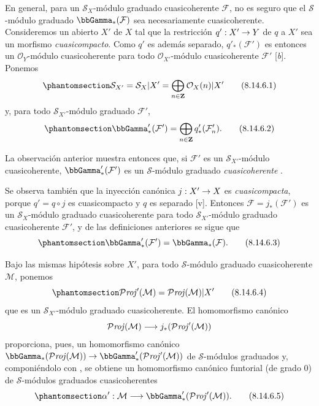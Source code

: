 \documentclass[oneside,10pt]{amsart}
\makeatletter
\newcommand{\ega@arrow}[2]{\mathchoice{#1}{#2}{#2}{#2}}
\renewcommand{\to}{\ega@arrow{\longrightarrow}{\rightarrow}}
\let\EGAOriginalLabel\label
\renewcommand{\label}[1]{\phantomsection\EGAOriginalLabel{#1}}
\makeatother
\begin{document}
\begin{env}[8.14.6]
\label{II.8.14.6-fr}
En general, para un $\mathcal{S}_X$-módulo graduado cuasicoherente $\mathcal{F}$, no es seguro que el $\mathcal{S}$-módulo graduado $\bbGamma_*(\mathcal{F})$ sea necesariamente cuasicoherente.
Consideremos un abierto $X'$ de $X$ tal que la restricción $q':X'\to Y$ de $q$ a $X'$ sea un morfismo \emph{cuasicompacto}.
Como $q'$ es además separado, $q'_*(\mathcal{F}')$ es entonces un $\mathcal{O}_Y$-módulo cuasicoherente para todo $\mathcal{O}_{X'}$-módulo cuasicoherente $\mathcal{F}'$ [\emph{b}].
Ponemos
\begin{equation}
\label{II.8.14.6.1-fr}
  \mathcal{S}_{X'}=\mathcal{S}_X|X'
  =\bigoplus_{n\in\mathbf{Z}}\mathcal{O}_X(n)|X'
\tag{8.14.6.1}
\end{equation}
y, para todo $\mathcal{S}_{X'}$-módulo graduado $\mathcal{F}'$,
\begin{equation}
\label{II.8.14.6.2-fr}
  \bbGamma'_*(\mathcal{F}')=
  \bigoplus_{n\in\mathbf{Z}}q'_*(\mathcal{F}'_n).
\tag{8.14.6.2}
\end{equation}

La observación anterior muestra entonces que, si $\mathcal{F}'$ es un $\mathcal{S}_{X'}$-módulo cuasicoherente, $\bbGamma'_*(\mathcal{F}')$ es un $\mathcal{S}$-módulo graduado \emph{cuasicoherente} .

Se observa también que la inyección canónica $j:X'\to X$ es \emph{cuasicompacta}, porque $q'=q\circ j$ es cuasicompacto y $q$ es separado [v].
Entonces $\mathcal{F}=j_*(\mathcal{F}')$ es un $\mathcal{S}_X$-módulo graduado cuasicoherente para todo $\mathcal{S}_{X'}$-módulo graduado cuasicoherente $\mathcal{F}'$, y de las definiciones anteriores se sigue que
\begin{equation}
\label{II.8.14.6.3-fr}
  \bbGamma'_*(\mathcal{F}')=\bbGamma_*(\mathcal{F}).
\tag{8.14.6.3}
\end{equation}

Bajo las mismas hipótesis sobre $X'$, para todo $\mathcal{S}$-módulo graduado cuasicoherente $\mathcal{M}$, ponemos
\begin{equation}
\label{II.8.14.6.4-fr}
  \mathcal{P}\mathit{roj}'(\mathcal{M})
  =\mathcal{P}\mathit{roj}(\mathcal{M})|X'
\tag{8.14.6.4}
\end{equation}
que es un $\mathcal{S}_{X'}$-módulo graduado cuasicoherente.
El homomorfismo canónico
\[
  \mathcal{P}\mathit{roj}(\mathcal{M})\to
  j_*(\mathcal{P}\mathit{roj}'(\mathcal{M}))
\]
 proporciona, pues, un homomorfismo canónico $\bbGamma_*(\mathcal{P}\mathit{roj}(\mathcal{M}))\to
\bbGamma'_*(\mathcal{P}\mathit{roj}'(\mathcal{M}))$ de $\mathcal{S}$-módulos graduados y, componiéndolo con , se obtiene un homomorfismo canónico funtorial (de grado $0$) de $\mathcal{S}$-módulos graduados cuasicoherentes
\begin{equation}
\label{II.8.14.6.5-fr}
  \alpha':\mathcal{M}\to
  \bbGamma'_*(\mathcal{P}\mathit{roj}'(\mathcal{M})).
\tag{8.14.6.5}
\end{equation}
\end{env}
\end{document}
